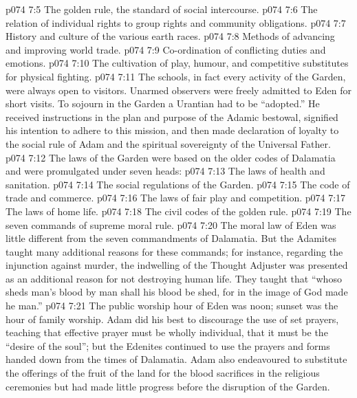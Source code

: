\vs p074 7:5 \bibnobreakspace The golden rule, the standard of social intercourse.
\vs p074 7:6 \bibnobreakspace The relation of individual rights to group rights and community obligations.
\vs p074 7:7 \bibnobreakspace History and culture of the various earth races.
\vs p074 7:8 \bibnobreakspace Methods of advancing and improving world trade.
\vs p074 7:9 \bibnobreakspace Co\hyp{}ordination of conflicting duties and emotions.
\vs p074 7:10 \bibnobreakspace The cultivation of play, humour, and competitive substitutes for physical fighting.
\vs p074 7:11 \pc The schools, in fact every activity of the Garden, were always open to visitors. Unarmed observers were freely admitted to Eden for short visits. To sojourn in the Garden a Urantian had to be “adopted.” He received instructions in the plan and purpose of the Adamic bestowal, signified his intention to adhere to this mission, and then made declaration of loyalty to the social rule of Adam and the spiritual sovereignty of the Universal Father.
\vs p074 7:12 \pc The laws of the Garden were based on the older codes of Dalamatia and were promulgated under seven heads:
\vs p074 7:13 \bibnobreakspace The laws of health and sanitation.
\vs p074 7:14 \bibnobreakspace The social regulations of the Garden.
\vs p074 7:15 \bibnobreakspace The code of trade and commerce.
\vs p074 7:16 \bibnobreakspace The laws of fair play and competition.
\vs p074 7:17 \bibnobreakspace The laws of home life.
\vs p074 7:18 \bibnobreakspace The civil codes of the golden rule.
\vs p074 7:19 \bibnobreakspace The seven commands of supreme moral rule.
\vs p074 7:20 \pc The moral law of Eden was little different from the seven commandments of Dalamatia. But the Adamites taught many additional reasons for these commands; for instance, regarding the injunction against murder, the indwelling of the Thought Adjuster was presented as an additional reason for not destroying human life. They taught that “whoso sheds man’s blood by man shall his blood be shed, for in the image of God made he man.”
\vs p074 7:21 The public worship hour of Eden was noon; sunset was the hour of family worship. Adam did his best to discourage the use of set prayers, teaching that effective prayer must be wholly individual, that it must be the “desire of the soul”; but the Edenites continued to use the prayers and forms handed down from the times of Dalamatia. Adam also endeavoured to substitute the offerings of the fruit of the land for the blood sacrifices in the religious ceremonies but had made little progress before the disruption of the Garden.
